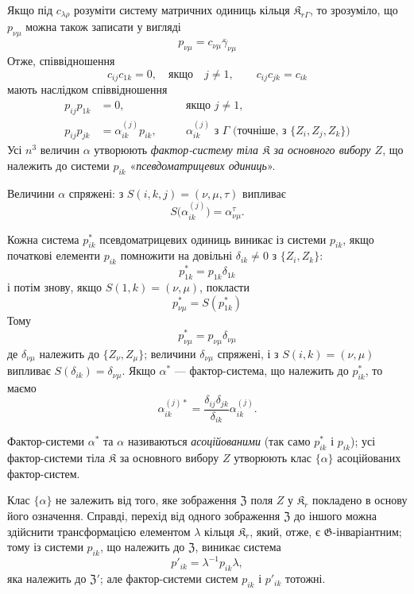 \documentclass[11pt]{article}
\begin{document}
Якщо під \(c_{\lambda\rho}\) розуміти систему матричних одиниць кільця \(\mathfrak K_{r\Gamma}\), то зрозуміло, що \(p_{\nu\mu}\) можна також записати у вигляді
\[
p_{\nu\mu}=c_{\nu\mu}\bar\gamma_{\nu\mu}
\]
Отже, співвідношення
\[
c_{ij}c_{1k}=0,\quad\text{якщо}\quad j\ne1,
\qquad
c_{ij}c_{jk}=c_{ik}
\]
мають наслідком співвідношення
\[
\begin{aligned}
p_{ij}p_{1k}&=0,\quad &&\text{якщо }j\ne1,\\
p_{ij}p_{jk}&=\alpha_{ik}^{(j)}p_{ik},\quad
&&\alpha_{ik}^{(j)}\text{ з }\Gamma\text{ (точніше, з }\{Z_i,Z_j,Z_k\}\text{)}
\end{aligned}
\]
Усі \(n^3\) величин \(\alpha\) утворюють \emph{фактор-систему тіла \(\mathfrak K\) за основного вибору \(Z\)}, що належить до системи \(p_{ik}\) «\emph{псевдоматрицевих одиниць}».

Величини \(\alpha\) спряжені: з \(S(i,k,j)=(\nu,\mu,\tau)\) випливає
\[
S\bigl(\alpha_{ik}^{(j)}\bigr)=\alpha_{\nu\mu}^{\tau}.
\]

Кожна система \(p_{ik}^*\) псевдоматрицевих одиниць виникає із системи \(p_{ik}\), якщо початкові елементи \(p_{ik}\) помножити на довільні \(\delta_{ik}\ne0\) з \(\{Z_i,Z_k\}\):
\[
p_{1k}^*=p_{1k}\delta_{1k}
\]
і потім знову, якщо \(S(1,k)=(\nu,\mu)\), покласти
\[
p_{\nu\mu}^*=S(p_{1k}^*)
\]
Тому
\[
p_{\nu\mu}^*=p_{\nu\mu}\delta_{\nu\mu}
\]
де \(\delta_{\nu\mu}\) належить до \(\{Z_\nu,Z_\mu\}\); величини \(\delta_{\nu\mu}\) спряжені, і з \(S(i,k)=(\nu,\mu)\) випливає \(S(\delta_{ik})=\delta_{\nu\mu}\). Якщо \(\alpha^*\) --- фактор-система, що належить до \(p_{ik}^*\), то маємо
\[
\alpha_{ik}^{(j)*}=\frac{\delta_{ij}\delta_{jk}}{\delta_{ik}}\alpha_{ik}^{(j)}.
\]

Фактор-системи \(\alpha^*\) та \(\alpha\) називаються \emph{асоційованими} (так само \(p_{ik}^*\) і \(p_{ik}\)); усі фактор-системи тіла \(\mathfrak K\) за основного вибору \(Z\) утворюють клас \(\{\alpha\}\) асоційованих фактор-систем.

Клас \(\{\alpha\}\) не залежить від того, яке зображення \(\mathfrak Z\) поля \(Z\) у \(\mathfrak K_r\) покладено в основу його означення. Справді, перехід від одного зображення \(\mathfrak Z\) до іншого можна здійснити трансформацією елементом \(\lambda\) кільця \(\mathfrak K_r\), який, отже, є \(\mathfrak G\)-інваріантним; тому із системи \(p_{ik}\), що належить до \(\mathfrak Z\), виникає система
\[
p'_{ik}=\lambda^{-1}p_{ik}\lambda,
\]
яка належить до \(\mathfrak Z'\); але фактор-системи систем \(p_{ik}\) і \(p'_{ik}\) тотожні.
\end{document}

